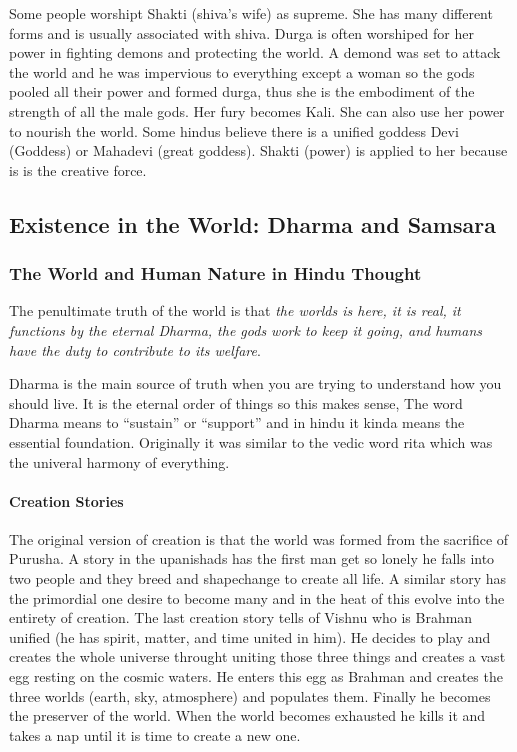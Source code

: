 \documentclass{article}
\begin{document}
Some people worshipt Shakti (shiva's wife) as supreme. She has many different forms and is usually associated with shiva. Durga is often worshiped for her power in fighting demons and protecting the world. A demond was set to attack the world and he was impervious to everything except a woman so the gods pooled all their power and formed durga, thus she is the embodiment of the strength of all the male gods. Her fury becomes Kali. She can also use her power to nourish the world. Some hindus believe there is a unified goddess Devi (Goddess) or Mahadevi (great goddess). Shakti (power) is applied to her because is is the creative force.


\subsection{Existence in the World: Dharma and Samsara}
\label{sub:existence_in_the_world_dharma_and_samsara}
\subsubsection{The World and Human Nature in Hindu Thought}
\label{ssub:the_world_and_human_nature_in_hindu_thought}
The penultimate truth of the world is that \emph{the worlds is here, it is real, it functions by the eternal Dharma, the gods work to keep it going, and humans have the duty to contribute to its welfare}.

Dharma is the main source of truth when you are trying to understand how you should live. It is the eternal order of things so this makes sense, The word Dharma means to ``sustain'' or ``support'' and in hindu it kinda means the essential foundation. Originally it was similar to the vedic word rita which was the univeral harmony of everything.

\paragraph{Creation Stories}
\label{par:creation_stories}
The original version of creation is that the world was formed from the sacrifice of Purusha. A story in the upanishads has the first man get so lonely he falls into two people and they breed and shapechange to create all life. A similar story has the primordial one desire to become many and in the heat of this evolve into the entirety of creation. The last creation story tells of Vishnu who is Brahman unified (he has spirit, matter, and time united in him). He decides to play and creates the whole universe throught uniting those three things and creates a vast egg resting on the cosmic waters. He enters this egg as Brahman and creates the three worlds (earth, sky, atmosphere) and populates them. Finally he becomes the preserver of the world. When the world becomes exhausted he kills it and takes a nap until it is time to create a new one.
\end{document}
